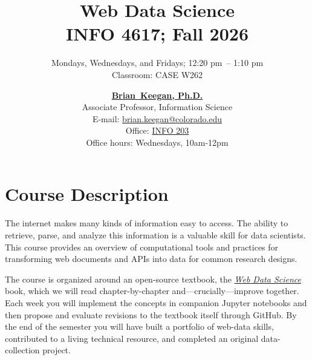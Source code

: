 \documentclass[11pt]{memoir}
\makeatletter
\def\coursename{Web Data Science}
\def\courselisting{INFO 4617}
\def\classroom{CASE W262}
\def\bookurl{https://cuinfoscience.github.io/Web-Data-Science-Book/}
\def\meetingdays{Mondays, Wednesdays, and Fridays}
\def\starttime{12:20 pm}
\def\endtime{1:10 pm}
\def\meetingtimes{\starttime~-- \endtime}
\def\semester{Fall 2026}
\def\instructorfirstname{Brian}
\def\instructorlastname{Keegan}
\def\instructorfullname{\instructorfirstname~\instructorlastname, Ph.D.}
\def\instructortitle{Associate Professor, Information Science}
\def\instructoroffice{\href{https://www.colorado.edu/map/?id=336\#!m/193981}{INFO 203}}
\def\instructoremail{brian.keegan@colorado.edu}
\def\instructorwebsite{http://www.brianckeegan.com}
\def\instructorofficehours{Wednesdays, 10am-12pm}
\makeatother
\begin{document}
\nobibliography*


\title{
    \textbf{\huge{\coursename}}\\
    \vspace{5pt} \normalsize{\courselisting}; \semester
}

\author{
    \meetingdays; \meetingtimes\\
    Classroom: \classroom
}

\date{
    \normalsize{
        \href{\instructorwebsite}{\textbf{\instructorfullname}}\\
        \instructortitle\\
        E-mail: \href{mailto:\instructoremail}{\instructoremail}\\
        Office: \instructoroffice\\
        Office hours: \instructorofficehours
    }
}

\maketitle



\section{Course Description}

The internet makes many kinds of information easy to access. The ability to retrieve, parse, and analyze this information is a valuable skill for data scientists. This course provides an overview of computational tools and practices for transforming web documents and APIs into data for common research designs.

The course is organized around an open-source textbook, the \href{\bookurl}{\textit{Web Data Science}} book, which we will read chapter-by-chapter and---crucially---improve together. Each week you will implement the concepts in companion Jupyter notebooks and then propose and evaluate revisions to the textbook itself through GitHub. By the end of the semester you will have built a portfolio of web-data skills, contributed to a living technical resource, and completed an original data-collection project.
\end{document}
